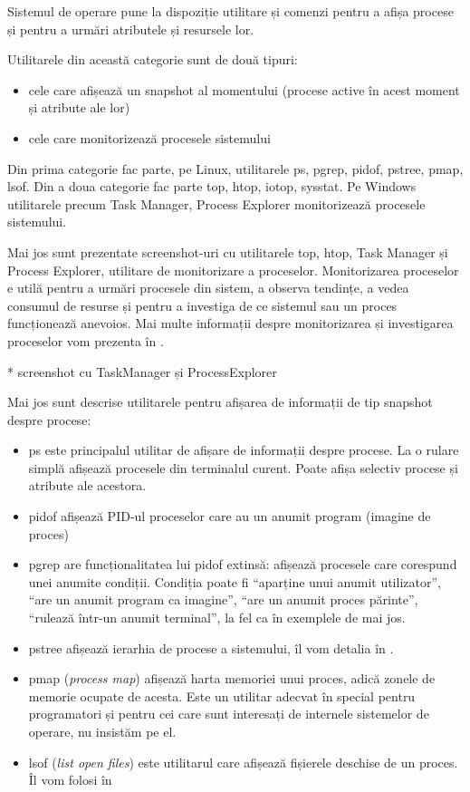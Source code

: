 Sistemul de operare pune la dispoziție utilitare și comenzi pentru a afișa
procese și pentru a urmări atributele și resursele lor.

Utilitarele din această categorie sunt de două tipuri:

\begin{itemize}
	\item cele care afișează un snapshot al momentului (procese active în
		acest moment și atribute ale lor)
	\item cele care monitorizează procesele sistemului
\end{itemize}

Din prima categorie fac parte, pe Linux, utilitarele ps, pgrep, pidof, pstree,
pmap, lsof. Din a doua categorie fac parte top, htop, iotop, sysstat. Pe Windows
utilitarele precum Task Manager, Process Explorer monitorizează procesele
sistemului.

Mai jos sunt prezentate screenshot-uri cu utilitarele top, htop, Task Manager și
Process Explorer, utilitare de monitorizare a proceselor. Monitorizarea
proceselor e utilă pentru a urmări procesele din sistem, a observa tendințe, a
vedea consumul de resurse și pentru a investiga de ce sistemul sau un proces
funcționează anevoios. Mai multe informații despre monitorizarea și investigarea
proceselor vom prezenta în .

* screenshot cu TaskManager și ProcessExplorer

Mai jos sunt descrise utilitarele pentru afișarea de informații de tip snapshot
despre procese:

\begin{itemize}
	\item ps este principalul utilitar de afișare de informații despre
		procese. La o rulare simplă afișează procesele din terminalul
		curent. Poate afișa selectiv procese și atribute ale acestora.
	\item pidof afișează PID-ul proceselor care au un anumit program
		(imagine de proces)
	\item pgrep are funcționalitatea lui pidof extinsă: afișează procesele
		care corespund unei anumite condiții. Condiția poate fi
		“aparține unui anumit utilizator”, “are un anumit program ca
		imagine”, “are un anumit proces părinte”, “rulează într-un
		anumit terminal”, la fel ca în exemplele de mai jos.
	\item pstree afișează ierarhia de procese a sistemului, îl vom detalia
		în .
	\item pmap (\textit{process map}) afișează harta memoriei unui proces,
		adică zonele de memorie ocupate de acesta. Este un utilitar
		adecvat în special pentru programatori și pentru cei care sunt
		interesați de internele sistemelor de operare, nu insistăm pe
		el.
	\item lsof (\textit{list open files}) este utilitarul care afișează
		fișierele deschise de un proces. Îl vom folosi în
\end{itemize}

